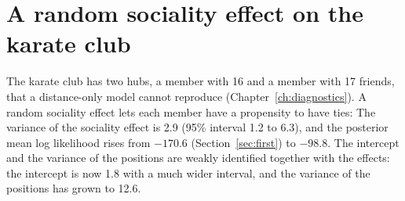 \section{A random sociality effect on the karate club}

The karate club has two hubs, a member with 16 and a member with 17 friends, that a distance-only model cannot reproduce (Chapter~\ref{ch:diagnostics}). A random sociality effect lets each member have a propensity to have ties:
The variance of the sociality effect is 2.9 (95\% interval 1.2 to 6.3), and the posterior mean log likelihood rises from $-170.6$ (Section~\ref{sec:first}) to $-98.8$. The intercept and the variance of the positions are weakly identified together with the effects: the intercept is now 1.8 with a much wider interval, and the variance of the positions has grown to 12.6.
